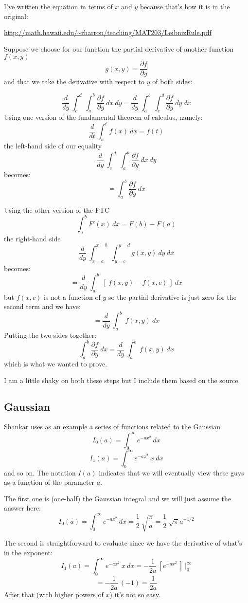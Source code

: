 \documentclass[11pt, oneside]{article}
\begin{document}
I've written the equation in terms of $x$ and $y$ because that's how it is in the original:

\url{http://math.hawaii.edu/~rharron/teaching/MAT203/LeibnizRule.pdf}

Suppose we choose for our function the partial derivative of another function $f(x,y)$
\[ g(x,y) = \frac{\partial f}{\partial y} \]
and that we take the derivative with respect to $y$ of both sides:

\[ \frac{d}{dy} \ \int_c^d \ \int_a^b \frac{\partial f}{\partial y} \ dx \ dy =   \frac{d}{dy} \ \int_a^b \  \int_c^d  \frac{\partial f}{\partial y} \ dy \ dx \]
Using one version of the fundamental theorem of calculus, namely:
\[ \frac{d}{dt} \ \int_a^t f(x) \ dx = f(t) \]
the left-hand side of our equality
\[ \frac{d}{dy} \ \int_c^d \ \int_a^b \frac{\partial f}{\partial y} \ dx \ dy \]
becomes:
\[ = \int_a^b \frac{\partial f}{\partial y} \ dx \]

Using the other version of the FTC
\[ \int_a^b F'(x) \ dx = F(b) - F(a) \]
the right-hand side
\[ \frac{d}{dy} \ \int_{x=a}^{x=b} \  \int_{y=c}^{y=d}  g(x,y) \ dy \ dx \]
becomes:
\[ = \frac{d}{dy} \ \int_a^b \ [ \  f(x,y) - f(x,c) \ ] \ dx \]
but $f(x,c)$ is not a function of $y$ so the partial derivative is just zero for the second term and we have:
\[ = \frac{d}{dy} \ \int_a^b \  f(x,y)  \ dx \]
Putting the two sides together:
\[  \int_a^b \frac{\partial f}{\partial y} \ dx = \frac{d}{dy} \ \int_a^b \  f(x,y)  \ dx \]
which is what we wanted to prove.

I am a little shaky on both these steps but I include them based on the source.

\subsection*{Gaussian}
Shankar uses as an example a series of functions related to the Gaussian
\[ I_0(a) = \int_0^{\infty} e^{-ax^2} \ dx \]
\[ I_1(a) = \int_0^{\infty} e^{-ax^2} \ x \ dx \]
and so on.  The notation $I(a)$ indicates that we will eventually view these guys as a function of the parameter $a$.

The first one is (one-half) the Gaussian integral and we will just assume the answer here:
\[ I_0(a) = \int_0^{\infty} e^{-ax^2} \ dx = \frac{1}{2} \ \sqrt{\frac{\pi}{a}} = \frac{1}{2} \ \sqrt{\pi} a^{-1/2}  \]

The second is straightforward to evaluate since we have the derivative of what's in the exponent:
\[ I_1(a) = \int_0^{\infty} e^{-ax^2} \ x \ dx = -\frac{1}{2a} \ [ e^{-ax^2} \  ] \ \bigg |_0^{\infty} \]
\[ = -\frac{1}{2a} \ (-1) = \frac{1}{2a} \]
After that (with higher powers of $x$) it's not so easy.
\end{document}
